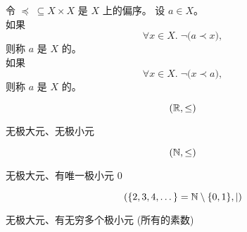 
\begin{frame}{}
  \begin{definition}
    令 $\preceq \;\subseteq X \times X$ 是 $X$ 上的偏序。
    设 $a \in X$。\\[5pt]

    \pause
    如果
    \[
      \forall x \in X.\; \lnot \big(a \prec x \big),
    \]
    则称 $a$ 是 $X$ 的。\\[10pt]

    \pause
    如果
    \[
      \forall x \in X.\; \lnot \big(x \prec a \big),
    \]
    则称 $a$ 是 $X$ 的。
  \end{definition}

  \pause
  \vspace{0.30cm}
  \begin{center}
  \end{center}
\end{frame}

\begin{frame}{}
\end{frame}

\begin{frame}{}
  \begin{exampleblock}{}
    \[
      (\mathbb{R}, \le)
    \]
    \pause
    \begin{center}
      无极大元、无极小元
    \end{center}
  \end{exampleblock}

  \pause
  \vspace{0.30cm}
  \begin{exampleblock}{}
    \[
      (\mathbb{N}, \le)
    \]
    \pause
    \begin{center}
      无极大元、有唯一极小元 $0$
    \end{center}
  \end{exampleblock}
\end{frame}

\begin{frame}{}
  \begin{exampleblock}{}
    \[
      (\{2, 3, 4, \dots\} = \mathbb{N} \setminus \{0, 1\}, \mid)
    \]
    \pause
    \begin{center}
      无极大元、有无穷多个极小元 (所有的素数)
    \end{center}
  \end{exampleblock}

  \pause
\end{frame}

